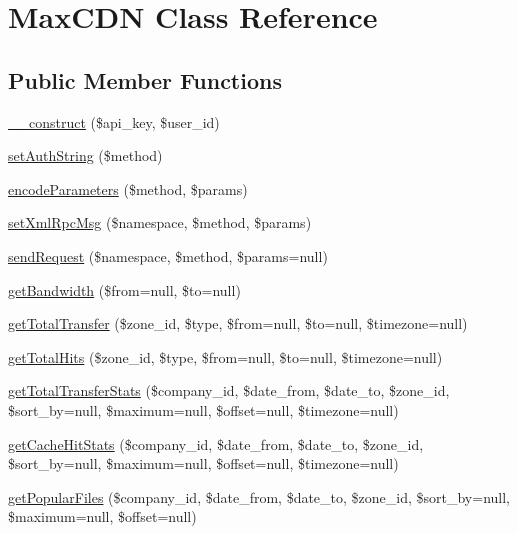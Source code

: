 \hypertarget{class_max_c_d_n}{
\section{MaxCDN Class Reference}
\label{class_max_c_d_n}
}
\subsection*{Public Member Functions}
\begin{DoxyCompactItemize}
\item 
\hyperlink{class_max_c_d_n_a190228266dc0a8defc0c6a8fa8bf2079}{\_\-\_\-construct} (\$api\_\-key, \$user\_\-id)
\item 
\hyperlink{class_max_c_d_n_ae777d7e14890a345988fffed800d0e8e}{setAuthString} (\$method)
\item 
\hyperlink{class_max_c_d_n_ab03d4f2c7f3b6d1e3505f25c33ac4eb4}{encodeParameters} (\$method, \$params)
\item 
\hyperlink{class_max_c_d_n_a8c54c313b1f5bbae025c3c30cf12a1ee}{setXmlRpcMsg} (\$namespace, \$method, \$params)
\item 
\hyperlink{class_max_c_d_n_aa496f1ad190fdbd8682df3dea24abf1a}{sendRequest} (\$namespace, \$method, \$params=null)
\item 
\hyperlink{class_max_c_d_n_aa7c52da790e6d9e3acceb12d93c90de6}{getBandwidth} (\$from=null, \$to=null)
\item 
\hyperlink{class_max_c_d_n_a4182fd3c7541817bfed426647cdf24b6}{getTotalTransfer} (\$zone\_\-id, \$type, \$from=null, \$to=null, \$timezone=null)
\item 
\hyperlink{class_max_c_d_n_aa14c507a271bdd2536047035549153e7}{getTotalHits} (\$zone\_\-id, \$type, \$from=null, \$to=null, \$timezone=null)
\item 
\hyperlink{class_max_c_d_n_a2f721064cd497651f42b949d8cbeae27}{getTotalTransferStats} (\$company\_\-id, \$date\_\-from, \$date\_\-to, \$zone\_\-id, \$sort\_\-by=null, \$maximum=null, \$offset=null, \$timezone=null)
\item 
\hyperlink{class_max_c_d_n_a2eba6ff5a4ac4d5348b6fc17ad4e90de}{getCacheHitStats} (\$company\_\-id, \$date\_\-from, \$date\_\-to, \$zone\_\-id, \$sort\_\-by=null, \$maximum=null, \$offset=null, \$timezone=null)
\item 
\hyperlink{class_max_c_d_n_ad34a2fa79fb678324ec5d8a98f6f58f4}{getPopularFiles} (\$company\_\-id, \$date\_\-from, \$date\_\-to, \$zone\_\-id, \$sort\_\-by=null, \$maximum=null, \$offset=null)
\item 

\end{DoxyCompactItemize}
